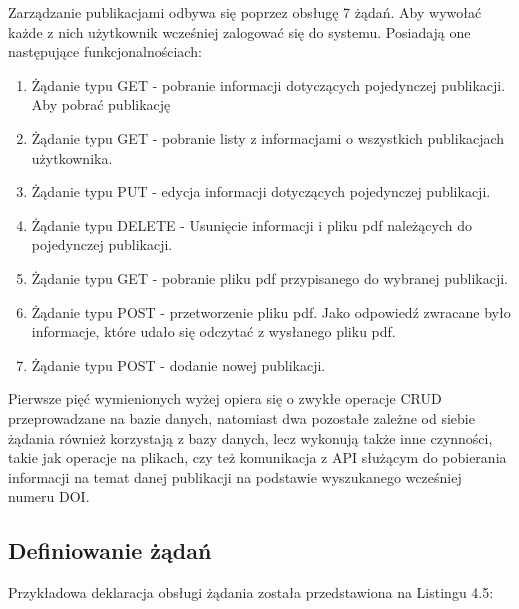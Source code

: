 \documentclass[a4paper,12pt,twoside,openany]{report}
\begin{document}
Zarządzanie publikacjami odbywa się poprzez obsługę 7 żądań. Aby wywołać każde z nich użytkownik wcześniej zalogować się do systemu. Posiadają one następujące funkcjonalnościach:
\begin{enumerate}
	
	\item Żądanie typu GET - pobranie informacji dotyczących pojedynczej publikacji. Aby pobrać publikację 
	
	\item Żądanie typu GET - pobranie listy z informacjami o wszystkich publikacjach użytkownika. 
		
	\item Żądanie typu PUT - edycja informacji dotyczących pojedynczej publikacji.
	
	\item Żądanie typu DELETE - Usunięcie informacji i pliku pdf należących do pojedynczej publikacji.
	
	\item Żądanie typu GET - pobranie pliku pdf przypisanego do wybranej publikacji.
	
	\item Żądanie typu POST - przetworzenie pliku pdf. Jako odpowiedź zwracane było informacje, które udało się odczytać z wysłanego pliku pdf.
	
	\item Żądanie typu POST - dodanie nowej publikacji.
\end{enumerate}
\pagebreak
Pierwsze pięć wymienionych wyżej opiera się o zwykłe operacje CRUD przeprowadzane na bazie danych, natomiast dwa pozostałe zależne od siebie żądania również korzystają z bazy danych, lecz wykonują także inne czynności, takie jak operacje na plikach, czy też komunikacja z API służącym do pobierania informacji na temat danej publikacji na podstawie wyszukanego wcześniej numeru DOI.


\subsection{Definiowanie żądań}

Przykładowa deklaracja obsługi żądania została przedstawiona na Listingu 4.5:
\end{document}

